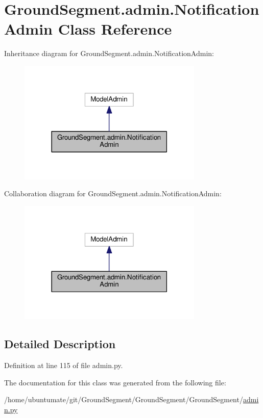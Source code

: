 \hypertarget{class_ground_segment_1_1admin_1_1_notification_admin}{}\section{Ground\+Segment.\+admin.\+Notification\+Admin Class Reference}
\label{class_ground_segment_1_1admin_1_1_notification_admin}


Inheritance diagram for Ground\+Segment.\+admin.\+Notification\+Admin\+:\nopagebreak
\begin{figure}[H]
\begin{center}
\leavevmode
\includegraphics[width=249pt]{class_ground_segment_1_1admin_1_1_notification_admin__inherit__graph}
\end{center}
\end{figure}


Collaboration diagram for Ground\+Segment.\+admin.\+Notification\+Admin\+:\nopagebreak
\begin{figure}[H]
\begin{center}
\leavevmode
\includegraphics[width=249pt]{class_ground_segment_1_1admin_1_1_notification_admin__coll__graph}
\end{center}
\end{figure}


\subsection{Detailed Description}


Definition at line 115 of file admin.\+py.



The documentation for this class was generated from the following file\+:\begin{DoxyCompactItemize}
\item 
/home/ubuntumate/git/\+Ground\+Segment/\+Ground\+Segment/\+Ground\+Segment/\hyperlink{admin_8py}{admin.\+py}\end{DoxyCompactItemize}
